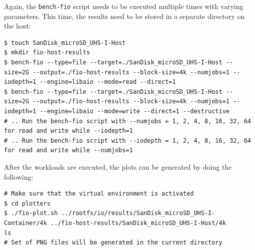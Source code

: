 Again, the \verb|bench-fio| script needs to be executed multiple times with varying parameters.
This time, the results need to be stored in a separate directory on the host: 
\begin{lstlisting}[label={code:implementation/benchmark/io-run}, style=bash, caption={}]
$ touch SanDisk_microSD_UHS-I-Host
$ mkdir fio-host-results
$ bench-fio --type=file --target=./SanDisk_microSD_UHS-I-Host --size=2G --output=./fio-host-results --block-size=4k --numjobs=1 --iodepth=1 --engine=libaio --mode=read --direct=1 
$ bench-fio --type=file --target=./SanDisk_microSD_UHS-I-Host --size=2G --output=./fio-host-results --block-size=4k --numjobs=1 --iodepth=1 --engine=libaio --mode=write --direct=1 --destructive 
# .. Run the bench-fio script with --numjobs = 1, 2, 4, 8, 16, 32, 64 for read and write while --iodepth=1
# .. Run the bench-fio script with --iodepth = 1, 2, 4, 8, 16, 32, 64 for read and write while --numjobs=1
\end{lstlisting}

After the workloads are executed, the plots can be generated by doing the following:
\begin{lstlisting}[label={code:implementation/benchmark/io-run}, style=bash, caption={}]
# Make sure that the virtual environment is activated 
$ cd plotters 
$ ./fio-plot.sh ../rootfs/io/results/SanDisk_microSD_UHS-I-Container/4k ../fio-host-results/SanDisk_microSD_UHS-I-Host/4k
ls 
# Set of PNG files will be generated in the current directory
\end{lstlisting}


